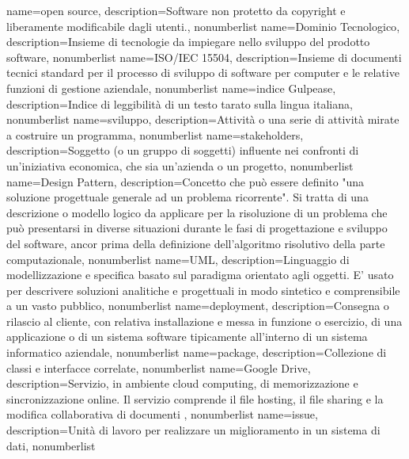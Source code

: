 {
	name={open source},
	description={Software non protetto da copyright e liberamente modificabile dagli utenti.},
	nonumberlist
}
{
	name={Dominio Tecnologico},
	description={Insieme di tecnologie da impiegare nello sviluppo del prodotto software},
	nonumberlist
}
{
	name={ISO/IEC 15504},
	description={Insieme di documenti tecnici standard per il processo di sviluppo di software per computer e le relative funzioni di gestione aziendale},
	nonumberlist
}
{
	name={indice Gulpease},
	description={Indice di leggibilità di un testo tarato sulla lingua italiana},
	nonumberlist
}
{
	name={sviluppo},
	description={Attività o una serie di attività mirate a costruire un programma},
	nonumberlist
}
{
	name={stakeholders},
	description={Soggetto (o un gruppo di soggetti) influente nei confronti di un'iniziativa economica, che sia un'azienda o un progetto},
	nonumberlist
}
{
	name={Design Pattern},
	description={Concetto che può essere definito "una soluzione progettuale generale ad un problema ricorrente". Si tratta di una descrizione o modello logico da applicare per la risoluzione di un problema che può presentarsi in diverse situazioni durante le fasi di progettazione e sviluppo del software, ancor prima della definizione dell'algoritmo risolutivo della parte computazionale},
	nonumberlist
}
{
	name={UML},
	description={Linguaggio di modellizzazione e specifica basato sul paradigma orientato agli oggetti. E' usato per descrivere soluzioni analitiche e progettuali in modo sintetico e comprensibile a un vasto pubblico},
	nonumberlist
}
{
	name={deployment},
	description={Consegna o rilascio al cliente, con relativa installazione e messa in funzione o esercizio, di una applicazione o di un sistema software tipicamente all'interno di un sistema informatico aziendale},
	nonumberlist
}
{
	name={package},
	description={Collezione di classi e interfacce correlate},
	nonumberlist
}
{
	name={Google Drive},
	description={Servizio, in ambiente cloud computing, di memorizzazione e sincronizzazione online. Il servizio comprende il file hosting, il file sharing e la modifica collaborativa di documenti },
	nonumberlist
}
{
	name={issue},
	description={Unità di lavoro per realizzare un miglioramento in un sistema di dati},
	nonumberlist
}
